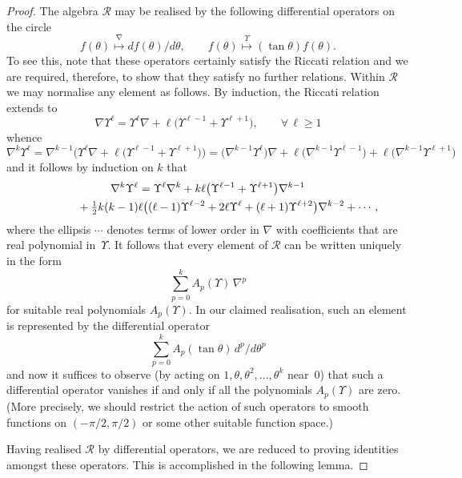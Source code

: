\documentclass[11pt]{article}
\begin{document}
\begin{proof} The algebra ${\mathcal{R}}$ may be realised by the
following dif\/ferential operators on the circle
\[f(\theta)\stackrel{\nabla}{\longmapsto} df(\theta)/d\theta,\qquad
f(\theta)\stackrel{\Upsilon}{\longmapsto}(\tan\theta)f(\theta).\]
To see this, note that these operators certainly satisfy the Riccati
relation and we are required, therefore, to show that they satisfy no further
relations. Within ${\mathcal{R}}$ we may normalise any element as follows. By
induction, the Riccati relation extends to
\[\nabla\Upsilon^\ell=
\Upsilon^\ell\nabla+\ell\big(\Upsilon^{\ell-1}+\Upsilon^{\ell+1}\big),\qquad
\forall\,\ell\geq 1\]
whence
\[\nabla^k\Upsilon^\ell
=\nabla^{k-1}\big(\Upsilon^\ell\nabla
+\ell\big(\Upsilon^{\ell-1}+\Upsilon^{\ell+1}\big)\big)
=\big(\nabla^{k-1}\Upsilon^\ell\big)\nabla
+\ell\big(\nabla^{k-1}\Upsilon^{\ell-1}\big)+\ell\big(\nabla^{k-1}\Upsilon^{\ell+1}\big)\]
and it follows by induction on $k$ that
\begin{gather*}
\nabla^k\Upsilon^\ell=
\Upsilon^\ell\nabla^k+k\ell\big(\Upsilon^{\ell-1}+\Upsilon^{\ell+1}\big)\nabla^{k-1}\\
\hphantom{\nabla^k\Upsilon^\ell=}{}
+\tfrac12k(k-1)\ell\big((\ell-1)\Upsilon^{\ell-2}+2\ell\Upsilon^\ell
+(\ell+1)\Upsilon^{\ell+2}\big)\nabla^{k-2}+\cdots,
\end{gather*}
where the ellipsis $\cdots$ denotes terms of lower order in $\nabla$ with
coef\/f\/icients that are real polynomial in~$\Upsilon$. It follows that every
element of ${\mathcal{R}}$ can be written uniquely in the form
\[ \sum_{p=0}^{k}A_p(\Upsilon)\,\nabla^p\]
for suitable real polynomials $A_p(\Upsilon)$. In our claimed realisation,
such an element is represented by the dif\/ferential operator
\[ \sum_{p=0}^{k}A_p(\tan\theta)\,d^p/d\theta^p\]
and now it suf\/f\/ices to observe (by acting on
$1,\theta,\theta^2,\ldots,\theta^{k}$ near~$0$) that such a dif\/ferential
operator vanishes if and only if all the polynomials $A_p(\Upsilon)$ are zero.
(More precisely, we should restrict the action of such operators to smooth
functions on $(-\pi/2,\pi/2)$ or some other suitable function space.)

Having realised ${\mathcal{R}}$ by dif\/ferential operators, we are reduced to
proving identities amongst these operators. This is accomplished in the
following lemma.\end{proof}
\end{document}
